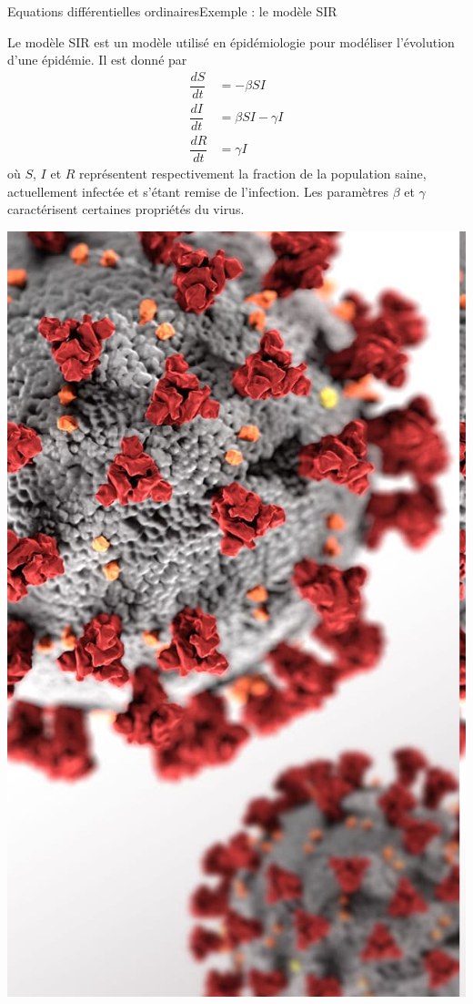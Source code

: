 \documentclass[usenames,dvipsnames,svgnames,10pt,aspectratio=169]{beamer}
\begin{document}
\begin{frame}[t, c]{Equations différentielles ordinaires}{Exemple : le modèle SIR}
  \begin{minipage}{.68\textwidth}
    Le modèle SIR est un modèle utilisé en épidémiologie pour modéliser l'évolution d'une épidémie.
    Il est donné par
    \[
    \begin{aligned}
      \dfrac{dS}{dt} & = - \beta SI \\
      \dfrac{dI}{dt} & = \beta SI - \gamma I \\
      \dfrac{dR}{dt} & = \gamma I
    \end{aligned}
    \]
    où $S$, $I$ et $R$ représentent respectivement la fraction de la population saine, actuellement infectée et s'étant remise de l'infection.
    Les paramètres $\beta$ et $\gamma$ caractérisent certaines propriétés du virus.
  \end{minipage}%
  \hfill
  \begin{minipage}{.28\textwidth}
    \centering
    \includegraphics[width=.8\textwidth]{virus}
  \end{minipage}
\end{frame}
\end{document}
